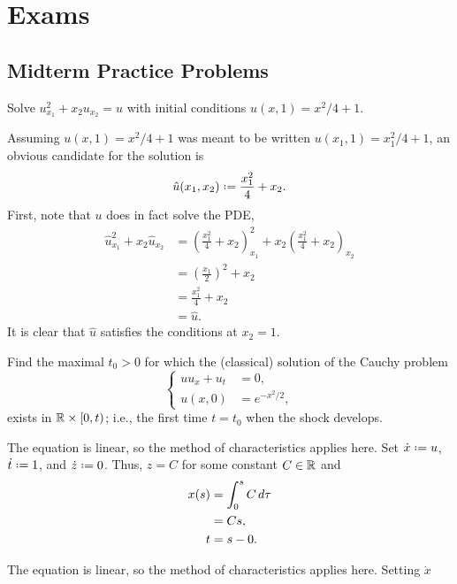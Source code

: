 \section{Exams}
\subsection{Midterm Practice Problems}
\begin{problem}
  Solve \(u_{x_1}^2+x_2u_{x_2}=u\) with initial conditions
  \(u(x,1)=x^2/4+1\).
\end{problem}
\begin{solution*}
  Assuming \(u(x,1)=x^2/4+1\) was meant to be written
  \(u(x_1,1)=x_1^2/4+1\), an obvious candidate for the solution is
  \[
    \hat u(x_1,x_2)\defeq\frac{x_1^2}{4}+x_2.
  \]
  First, note that \(u\) does in fact solve the PDE,
  \begin{align*}
    \hat u_{x_1}^2+x_2\hat u_{x_2}
    &=\left(\frac{x_1^2}{4}+x_2\right)_{x_1}^2
    +x_2\left(\frac{x_1^2}{4}+x_2\right)_{x_2}\\
    &=\left(\frac{x_1}{2}\right)^2+x_2\\
    &=\frac{x_1^2}{4}+x_2\\
    &=\hat u.
  \end{align*}
  It is clear that \(\hat u\) satisfies the conditions at \(x_2=1\).
\end{solution*}

\begin{problem}
  Find the maximal \(t_0>0\) for which the (classical) solution of the
  Cauchy problem
  \[
    \left\{
      \begin{aligned}
        uu_x+u_t&=0,\\
        u(x,0)&=e^{-x^2/2},
      \end{aligned}
    \right.
  \]
  exists in \(\mathbb{R}\times[0,t)\); i.e., the first time \(t=t_0\) when the
  shock develops.
\end{problem}
\begin{solution*}
  The equation is linear, so the method of characteristics applies
  here. Set \(\dot x\defeq u\), \(\dot t\defeq 1\), and \(\dot z\defeq
  0\). Thus, \(z=C\) for some constant \(C\in\mathbb{R}\) and
  \begin{align*}
    x(s)
    &=\int_0^s C\mathop{}\!d\tau\\
    &=Cs,\\
    t&=s-0.
  \end{align*}

  The equation is linear, so the method of characteristics applies
  here. Setting \(\dot x\)
\end{solution*}

